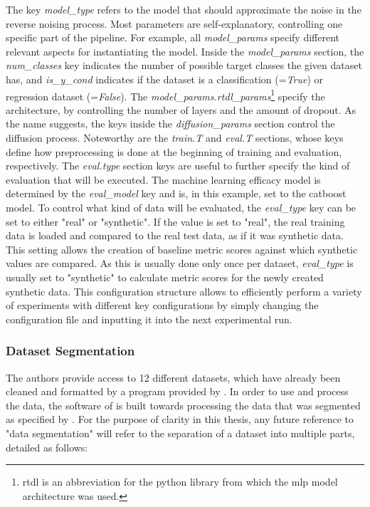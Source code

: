 The key \textit{model\_type} refers to the model that should approximate the noise in the reverse noising process.
Most parameters are self-explanatory, controlling one specific part of the pipeline.
For example, all \textit{model\_params} specify different relevant aspects for instantiating the model.
Inside the \textit{model\_params} section, the \textit{num\_classes} key indicates the number of possible target classes the given dataset has, and \textit{is\_y\_cond} indicates if the dataset is a classification (=\textit{True}) or regression dataset (=\textit{False}).
The \textit{model\_params.rtdl\_params}\footnote{rtdl is an abbreviation for the python library \cite{gorishniy2021RevisitingDeepLearning} from which the \gls{mlp} model architecture was used.} specify the  architecture, by controlling the number of layers and the amount of dropout.
As the name suggests, the keys inside the \textit{diffusion\_params} section control the diffusion process.
Noteworthy are the \textit{train.T} and \textit{eval.T} sections, whose keys define how preprocessing is done at the beginning of training and evaluation, respectively.
The \textit{eval.type} section keys are useful to further specify the kind of evaluation that will be executed.
The machine learning efficacy model is determined by the \textit{eval\_model} key and is, in this example, set to the catboost model.
To control what kind of data will be evaluated, the \textit{eval\_type} key can be set to either "real" or "synthetic".
If the value is set to "real", the real training data is loaded and compared to the real test data, as if it was synthetic data.
This setting allows the creation of baseline metric scores against which synthetic values are compared.
As this is usually done only once per dataset, \textit{eval\_type} is usually set to "synthetic" to calculate metric scores for the newly created synthetic data.
This configuration structure allows to efficiently perform a variety of experiments with different key configurations by simply changing the configuration file and inputting it into the next experimental run.

\subsubsection[]{Dataset Segmentation}
\label{sec:data_format}
The authors provide access to 12 different datasets, which have already been cleaned and formatted by a program provided by \textcite{gorishniy2023EmbeddingsNumericalFeatures}.
In order to use and process the data, the software of \cite{kotelnikov2022TabDDPMModellingTabular} is built towards processing the data that was segmented as specified by \textcite{gorishniy2023EmbeddingsNumericalFeatures}.
For the purpose of clarity in this thesis, any future reference to "data segmentation" will refer to the separation of a dataset into multiple parts, detailed as follows:

